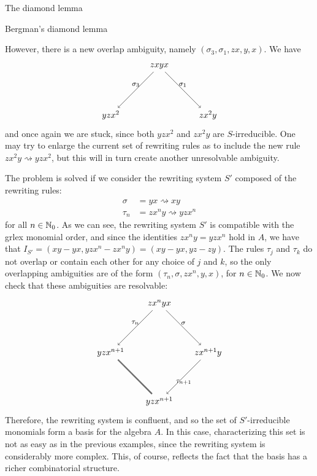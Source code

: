 \begin{chapter}{The diamond lemma}
\begin{section}{Bergman's diamond lemma}
\begin{exmp}
However, there is a new overlap ambiguity, namely $(\sigma_3, \sigma_1,zx,y,x)$. We have
\[
\begin{tikzpicture}
\node (1) at (0,0) {$zxyx$};
\node (a1) at (-2,-2) {$yzx^2$};
\node (a2) at (2,-2) {$zx^2y$};

\draw[->] (1) to node[above, font=\footnotesize]{$\sigma_3$} (a1);
\draw[->] (1) to node[above, font=\footnotesize]{$\sigma_1$} (a2);
\end{tikzpicture}
\]
and once again we are stuck, since both $yzx^2$ and $zx^2y$ are $S$-irreducible. One may try to enlarge the current set of rewriting rules as to include the new rule $zx^2y \rightsquigarrow yzx^2$, but this will in turn create another unresolvable ambiguity.

The problem is solved if we consider the rewriting system $S'$ composed of the rewriting rules:
\begin{align*}
\sigma &= yx \rightsquigarrow xy\\
\tau_n &= zx^ny \rightsquigarrow yzx^n
\end{align*}
for all $n\in\mathbb{N}_0$. As we can see, the rewriting system $S'$ is compatible with the grlex monomial order, and since the identities $zx^ny=yzx^n$ hold in $A$, we have that $I_{S'} = (xy-yx, yzx^n-zx^ny)=(xy-yx, yz-zy)$. The rules $\tau_j$ and $\tau_k$ do not overlap or contain each other for any choice of $j$ and $k$, so the only overlapping ambiguities are of the form $(\tau_n,\sigma,zx^n,y,x)$, for $n\in\mathbb{N}_0$. We now check that these ambiguities are resolvable:
\[
\begin{tikzpicture}
\node (1) at (0,0) {$zx^nyx$};
\node (a1) at (-2,-2) {$yzx^{n+1}$};
\node (a2) at (2,-2) {$zx^{n+1}y$};
\node (b) at (0,-4) {$yzx^{n+1}$};

\draw[->] (1) to node[above, font=\footnotesize]{$\tau_n$} (a1);
\draw[->] (1) to node[above, font=\footnotesize]{$\sigma$} (a2);
\draw[->] (a2) to node[below, font=\footnotesize]{$\tau_{n+1}$} (b);
\draw[double] (a1) to (b);
\end{tikzpicture}
\]
Therefore, the rewriting system is confluent, and so the set of $S'$-irreducible monomials form a basis for the algebra $A$. In this case, characterizing this set is not as easy as in the previous examples, since the rewriting system is considerably more complex. This, of course, reflects the fact that the basis has a richer combinatorial structure.
\end{exmp}


\end{section}
\end{chapter}
